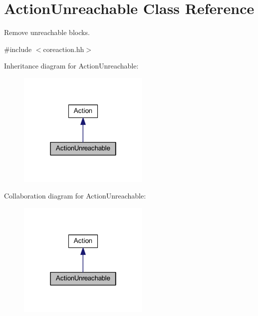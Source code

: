 \hypertarget{class_action_unreachable}{}\section{Action\+Unreachable Class Reference}
\label{class_action_unreachable}


Remove unreachable blocks.  




{\ttfamily \#include $<$coreaction.\+hh$>$}



Inheritance diagram for Action\+Unreachable\+:
\nopagebreak
\begin{figure}[H]
\begin{center}
\leavevmode
\includegraphics[width=178pt]{class_action_unreachable__inherit__graph}
\end{center}
\end{figure}


Collaboration diagram for Action\+Unreachable\+:
\nopagebreak
\begin{figure}[H]
\begin{center}
\leavevmode
\includegraphics[width=178pt]{class_action_unreachable__coll__graph}
\end{center}
\end{figure}
